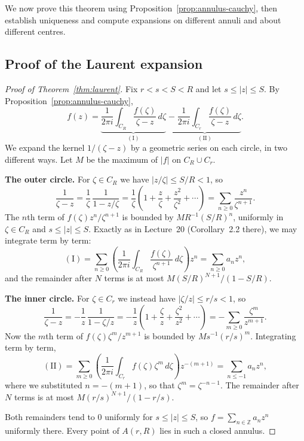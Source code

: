 \documentclass[11pt]{article}
\theoremstyle{plain}
\theoremstyle{definition}
\theoremstyle{boldremark}
\theoremstyle{remark}
\numberwithin{equation}{section}
\newcommand{\Z}{\mathbb{Z}}
\begin{document}
We now prove this theorem using Proposition~\ref{prop:annulus-cauchy},
then establish uniqueness and compute expansions on different
annuli and about different centres.

\subsection{Proof of the Laurent expansion}\label{sec:laurent-proof}
\begin{proof}[Proof of Theorem~\ref{thm:laurent}]
Fix $r<s<S<R$ and let $s\leq|z|\leq S$. By
Proposition~\ref{prop:annulus-cauchy},
\[
 f(z)=\underbrace{\frac{1}{2\pi i}\int_{C_R}\frac{f(\zeta)}{\zeta-z}\,d\zeta}_{(\mathrm{I})}
 \;\underbrace{-\;\frac{1}{2\pi i}\int_{C_r}\frac{f(\zeta)}{\zeta-z}\,d\zeta}_{(\mathrm{II})}.
\]
We expand the kernel $1/(\zeta-z)$ by a geometric series on each circle,
in two different ways. Let $M$ be the maximum of $|f|$ on $C_R\cup C_r$.

\textbf{The outer circle.} For $\zeta\in C_R$ we have
$|z/\zeta|\leq S/R<1$, so
\[
 \frac{1}{\zeta-z}=\frac{1}{\zeta}\,\frac{1}{1-z/\zeta}
 =\frac1\zeta\left(1+\frac z\zeta+\frac{z^2}{\zeta^2}+\cdots\right)
 =\sum_{n\geq0}\frac{z^n}{\zeta^{n+1}}.
\]
The $n$th term of $f(\zeta)z^n/\zeta^{n+1}$ is bounded by
$M R^{-1}(S/R)^n$, uniformly in $\zeta\in C_R$ and $s\leq|z|\leq S$.
Exactly as in Lecture~20 (Corollary~2.2 there), we may integrate term by
term:
\[
 (\mathrm{I})=\sum_{n\geq0}\left(\frac{1}{2\pi i}\int_{C_R}
 \frac{f(\zeta)}{\zeta^{n+1}}\,d\zeta\right)z^n=\sum_{n\geq0}a_nz^n,
\]
and the remainder after $N$ terms is at most $M(S/R)^{N+1}/(1-S/R)$.

\textbf{The inner circle.} For $\zeta\in C_r$ we instead have
$|\zeta/z|\leq r/s<1$, so
\[
 \frac{1}{\zeta-z}=-\frac1z\,\frac{1}{1-\zeta/z}
 =-\frac1z\left(1+\frac\zeta z+\frac{\zeta^2}{z^2}+\cdots\right)
 =-\sum_{m\geq0}\frac{\zeta^m}{z^{m+1}}.
\]
Now the $m$th term of $f(\zeta)\zeta^m/z^{m+1}$ is bounded by
$M s^{-1}(r/s)^m$. Integrating term by term,
\[
 (\mathrm{II})=\sum_{m\geq0}\left(\frac{1}{2\pi i}\int_{C_r}
 f(\zeta)\zeta^{m}\,d\zeta\right)z^{-(m+1)}
 =\sum_{n\leq-1}a_nz^n,
\]
where we substituted $n=-(m+1)$, so that $\zeta^m=\zeta^{-n-1}$. The
remainder after $N$ terms is at most $M(r/s)^{N+1}/(1-r/s)$.

Both remainders tend to $0$ uniformly for $s\leq|z|\leq S$, so
$f=\sum_{n\in\Z}a_nz^n$ uniformly there. Every point of $A(r,R)$ lies in
such a closed annulus.
\end{proof}
\end{document}
